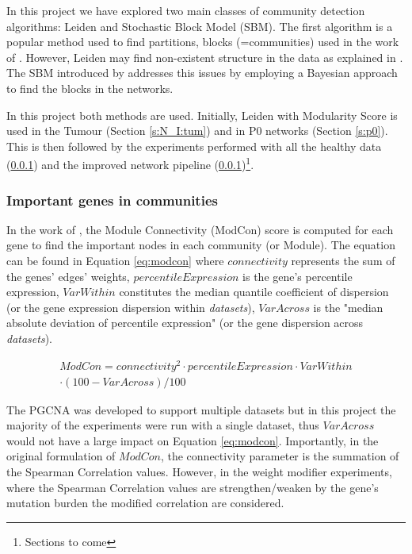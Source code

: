 In this project we have explored two main classes of community detection algorithms: Leiden and Stochastic Block Model (SBM). The first algorithm is a popular method used to find partitions, blocks (=communities) used in the work of \citet{Care2019-ij}. However, Leiden may find non-existent structure in the data as explained in \citet{Peixoto2021-jx}. The SBM introduced by \citet{Peixoto2019-fg} addresses this issues by employing a Bayesian approach to find the blocks in the networks. 

In this project both methods are used. Initially, Leiden with Modularity Score is used in the Tumour (Section \ref{s:N_I:tum}) and in P0 networks (Section \ref{s:p0}). This is then followed by the experiments performed with all the healthy data (\ref{}) and the improved network pipeline (\ref{})\footnote{Sections to come}.

\subsubsection{Important genes in communities}

In the work of \citet{Care2019-ij}, the  Module Connectivity (ModCon) score is computed for each gene to find the important nodes in each community (or Module). The equation can be found in Equation \ref{eq:modcon} where $connectivity$ represents the sum of the genes' edges' weights, $percentileExpression$ is the gene's percentile expression, $VarWithin$ constitutes the median quantile coefficient of dispersion (or the gene expression dispersion within \textit{datasets}), $VarAcross$ is the "median absolute deviation of percentile expression" (or the gene dispersion across \textit{datasets}).

\begin{multline} \label{eq:modcon}
         ModCon = connectivity^2 \cdot percentileExpression \cdot VarWithin \\
         \cdot (100 - VarAcross) / 100
\end{multline}

The PGCNA was developed to support multiple datasets but in this project the majority of the experiments were run with a single dataset, thus $VarAcross$ would not have a large impact on Equation \ref{eq:modcon}. Importantly, in the original formulation of $ModCon$, the connectivity parameter is the summation of the Spearman Correlation values. However, in the weight modifier experiments, where the Spearman Correlation values are strengthen/weaken by the gene's mutation burden the modified correlation are considered.

